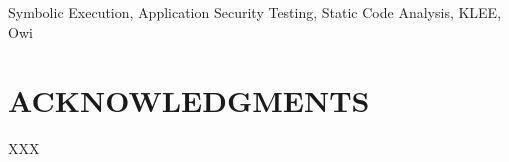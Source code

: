 \documentclass[conference]{IEEEtran}
\begin{document}
\begin{IEEEkeywords}
Symbolic Execution, Application Security Testing, Static Code Analysis, KLEE, Owi
\end{IEEEkeywords}









\section{ACKNOWLEDGMENTS}

XXX




\end{document}
